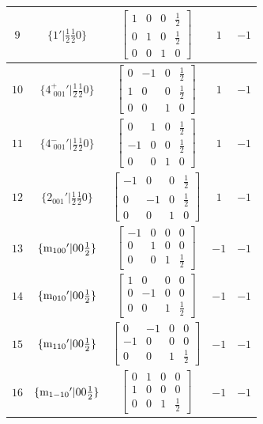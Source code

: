 \documentclass[fleqn,8pt]{jsarticle}
\begin{document}
\begin{longtable}{ccccc}
$ 9 $ & $ \{1{}'|\frac{1}{2} \frac{1}{2} 0\} $ & $ \begin{bmatrix} 1 & 0 & 0 & \frac{1}{2} \\ 0 & 1 & 0 & \frac{1}{2} \\ 0 & 0 & 1 & 0 \end{bmatrix} $ & $ 1 $ & $ -1 $ \\ \hline
$ 10 $ & $ \{4^{+}_{\,\,001}{}'|\frac{1}{2} \frac{1}{2} 0\} $ & $ \begin{bmatrix} 0 & -1 & 0 & \frac{1}{2} \\ 1 & 0 & 0 & \frac{1}{2} \\ 0 & 0 & 1 & 0 \end{bmatrix} $ & $ 1 $ & $ -1 $ \\ \hline
$ 11 $ & $ \{4^{-}_{\,\,001}{}'|\frac{1}{2} \frac{1}{2} 0\} $ & $ \begin{bmatrix} 0 & 1 & 0 & \frac{1}{2} \\ -1 & 0 & 0 & \frac{1}{2} \\ 0 & 0 & 1 & 0 \end{bmatrix} $ & $ 1 $ & $ -1 $ \\ \hline
$ 12 $ & $ \{2{}_{001}{}'|\frac{1}{2} \frac{1}{2} 0\} $ & $ \begin{bmatrix} -1 & 0 & 0 & \frac{1}{2} \\ 0 & -1 & 0 & \frac{1}{2} \\ 0 & 0 & 1 & 0 \end{bmatrix} $ & $ 1 $ & $ -1 $ \\ \hline
$ 13 $ & $ \{{\rm m}_{100}{}'|0 0 \frac{1}{2}\} $ & $ \begin{bmatrix} -1 & 0 & 0 & 0 \\ 0 & 1 & 0 & 0 \\ 0 & 0 & 1 & \frac{1}{2} \end{bmatrix} $ & $ -1 $ & $ -1 $ \\ \hline
$ 14 $ & $ \{{\rm m}_{010}{}'|0 0 \frac{1}{2}\} $ & $ \begin{bmatrix} 1 & 0 & 0 & 0 \\ 0 & -1 & 0 & 0 \\ 0 & 0 & 1 & \frac{1}{2} \end{bmatrix} $ & $ -1 $ & $ -1 $ \\ \hline
$ 15 $ & $ \{{\rm m}_{110}{}'|0 0 \frac{1}{2}\} $ & $ \begin{bmatrix} 0 & -1 & 0 & 0 \\ -1 & 0 & 0 & 0 \\ 0 & 0 & 1 & \frac{1}{2} \end{bmatrix} $ & $ -1 $ & $ -1 $ \\ \hline
$ 16 $ & $ \{{\rm m}_{1-10}{}'|0 0 \frac{1}{2}\} $ & $ \begin{bmatrix} 0 & 1 & 0 & 0 \\ 1 & 0 & 0 & 0 \\ 0 & 0 & 1 & \frac{1}{2} \end{bmatrix} $ & $ -1 $ & $ -1 $ \\
\end{longtable}
\end{document}
